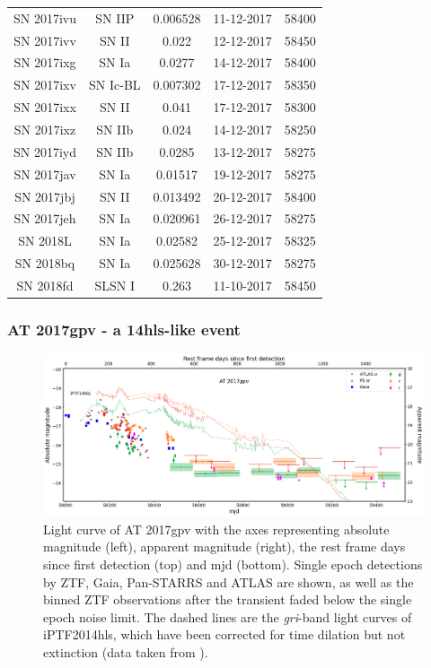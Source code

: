 \documentclass[a4paper,oneside,12pt, class=Latex/Classes/PhDthesisPSnPDF, crop=false]{standalone}
\begin{document}
\begin{longtable}{ccccc}
 SN 2017ivu & SN IIP & 0.006528 & 11-12-2017 & 58400 \\
 SN 2017ivv & SN II & 0.022 & 12-12-2017 & 58450 \\
 SN 2017ixg & SN Ia & 0.0277 & 14-12-2017 & 58400 \\
 SN 2017ixv & SN Ic-BL & 0.007302 & 17-12-2017 & 58350 \\
 SN 2017ixx & SN II & 0.041 & 17-12-2017 & 58300 \\
 SN 2017ixz & SN IIb & 0.024 & 14-12-2017 & 58250 \\
 SN 2017iyd & SN IIb & 0.0285 & 13-12-2017 & 58275 \\
 SN 2017jav & SN Ia & 0.01517 & 19-12-2017 & 58275 \\
 SN 2017jbj & SN II & 0.013492 & 20-12-2017 & 58400 \\
 SN 2017jeh & SN Ia & 0.020961 & 26-12-2017 & 58275 \\
 SN 2018L & SN Ia & 0.02582 & 25-12-2017 & 58325 \\
 SN 2018bq & SN Ia & 0.025628 & 30-12-2017 & 58275 \\
 SN 2018fd & SLSN I & 0.263 & 11-10-2017 & 58450 \\
\end{longtable}


\subsubsection{AT 2017gpv - a 14hls-like event}
\begin{figure}
    \centering
    \includegraphics[width=\textwidth]{../Images/chapter_4/17gpv.png}
    \caption{Light curve of AT 2017gpv with the axes representing absolute magnitude (left), apparent magnitude (right), the rest frame days since first detection (top) and mjd (bottom). Single epoch detections by ZTF, Gaia, Pan-STARRS and ATLAS are shown, as well as the binned ZTF observations after the transient faded below the single epoch noise limit. The dashed lines are the \textit{gri}-band light curves of iPTF2014hls, which have been corrected for time dilation but not extinction (data taken from \citealt{iPTF14hls_Iair, Sollerman_2019_iptf14hls}).}
    \label{17gpv_plot}
\end{figure}
\end{document}
